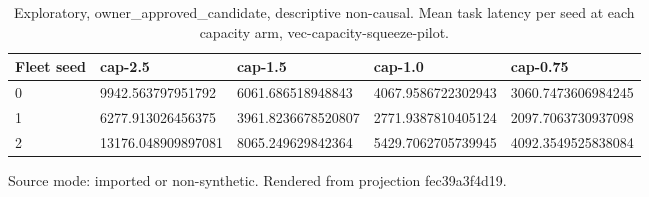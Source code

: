 {
\begin{table}[htbp]
\centering
\caption{Exploratory, owner\_approved\_candidate, descriptive non-causal. Mean task latency per seed at each capacity arm, vec-capacity-squeeze-pilot.}
\label{tab:traffictwin-metrics-fec39a3f4d19}
\small
\renewcommand{\arraystretch}{1.15}
\begin{tabular}{lllll}
\hline
Fleet seed & cap-2.5 & cap-1.5 & cap-1.0 & cap-0.75 \\
\hline
0 & 9942.563797951792 & 6061.686518948843 & 4067.9586722302943 & 3060.7473606984245 \\
1 & 6277.913026456375 & 3961.8236678520807 & 2771.9387810405124 & 2097.7063730937098 \\
2 & 13176.048909897081 & 8065.249629842364 & 5429.7062705739945 & 4092.3549525838084 \\
\hline
\end{tabular}
\par\footnotesize
Source mode: imported or non-synthetic.
Rendered from projection fec39a3f4d19.
\end{table}
}
